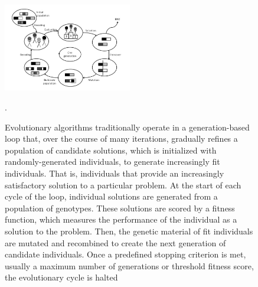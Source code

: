\begin{figure}
\centering
\includegraphics[width=0.5\textwidth]{img/working_principle_of_EA.jpg}
\caption{Evolutionary algorithms traditionally operate in a generation-based loop that, over the course of many iterations, gradually refines a population of candidate solutions, which is initialized with randomly-generated individuals, to generate increasingly fit individuals. That is, individuals that provide an increasingly satisfactory solution to a particular problem. At the start of each cycle of the loop, individual solutions are generated from a population of genotypes. These solutions are scored by a fitness function, which measures the performance of the individual as a solution to the problem. Then, the genetic material of fit individuals are mutated and recombined to create the next generation of candidate individuals. Once a predefined stopping criterion is met, usually a maximum number of generations or threshold fitness score, the evolutionary cycle is halted \cite{Prothmann2009EvolutionaryOptimisation}}.
\label{fig:working_principle}
\end{figure}